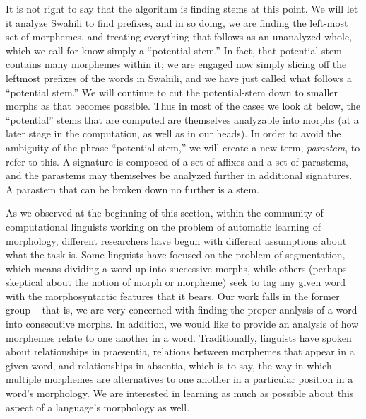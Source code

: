 \documentclass[output=paper,colorlinks,citecolor=brown,
]{langscibook}
\begin{document}
It is not right to say that the algorithm is finding stems at this point. We will let it analyze Swahili to find prefixes, and in so doing, we are finding the left-most set of morphemes, and treating everything that follows as an unanalyzed whole, which we call for know simply a ``potential-stem.'' In fact, that potential-stem contains many morphemes within it; we are engaged now simply slicing off the leftmost prefixes of the words in Swahili, and we have just called what follows a ``potential stem.''  We will continue to cut the potential-stem down to smaller morphs as that becomes possible. Thus in most of the cases we look at below, the ``potential'' stems that are computed are themselves analyzable into morphs (at a later stage in the computation, as well as in our heads). In order to avoid the ambiguity of the phrase ``potential stem,'' we will create a new term, \textit{parastem}, to refer to this. A signature is composed of a set of affixes and a set of parastems, and the parastems may themselves be analyzed further in additional signatures. A parastem that can be broken down no further is a stem.

As we observed at the beginning of this section, within the community of computational linguists working on the problem of automatic learning of morphology, different researchers have begun with different assumptions about what the task is. Some linguists have focused on the problem of segmentation, which means dividing a word up into successive morphs, while others (perhaps skeptical about the notion of morph or morpheme) seek to tag any given word with the morphosyntactic features that it bears. Our work falls in the former group -- that is, we are very concerned with finding the proper analysis of a word into consecutive morphs. In addition, we would like to provide an analysis of how morphemes relate to one another in a word. Traditionally, linguists have spoken about relationships in praesentia, relations between morphemes that appear in a given word, and relationships in absentia, which is to say, the way in which multiple morphemes are alternatives to one another in a particular position in a word's morphology. We are interested in learning as much as possible about this aspect of a language's morphology as well.
 
\end{document}
